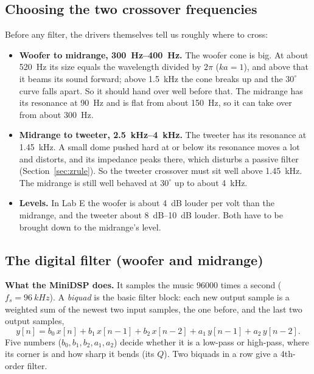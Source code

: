 \documentclass[a4paper,10pt]{article}
\begin{document}
\subsection{Choosing the two crossover frequencies}
Before any filter, the drivers themselves tell us roughly where to cross:
\begin{itemize}
\item \textbf{Woofer to midrange, \SIrange{300}{400}{Hz}.} The woofer cone is big. At about
  \SI{520}{Hz} its size equals the wavelength divided by $2\pi$ ($ka = 1$), and above that it beams
  its sound forward; above \SI{1.5}{kHz} the cone breaks up and the $30^\circ$ curve falls apart. So it
  should hand over well before that. The midrange has its resonance at \SI{90}{Hz} and is flat from
  about \SI{150}{Hz}, so it can take over from about \SI{300}{Hz}.
\item \textbf{Midrange to tweeter, \SIrange{2.5}{4}{kHz}.} The tweeter has its resonance at
  \SI{1.45}{kHz}. A small dome pushed hard at or below its resonance moves a lot and distorts, and its
  impedance peaks there, which disturbs a passive filter (Section~\ref{sec:zrule}). So the tweeter
  crossover must sit well above \SI{1.45}{kHz}. The midrange is still well behaved at $30^\circ$ up to
  about \SI{4}{kHz}.
\item \textbf{Levels.} In Lab E the woofer is about \SI{4}{dB} louder per volt than the midrange, and
  the tweeter about \SIrange{8}{10}{dB} louder. Both have to be brought down to the midrange's level.
\end{itemize}

\subsection{The digital filter (woofer and midrange)}\label{sec:dsp}
\textbf{What the MiniDSP does.} It samples the music \num{96000} times a second ($f_s = \SI{96}{kHz}$).
A \emph{biquad} is the basic filter block: each new output sample is a weighted sum of the newest two
input samples, the one before, and the last two output samples,
\[
y[n] = b_0\,x[n] + b_1\,x[n-1] + b_2\,x[n-2] + a_1\,y[n-1] + a_2\,y[n-2].
\]
Five numbers ($b_0, b_1, b_2, a_1, a_2$) decide whether it is a low-pass or high-pass, where its
corner is and how sharp it bends (its $Q$). Two biquads in a row give a 4th-order filter.
\end{document}
